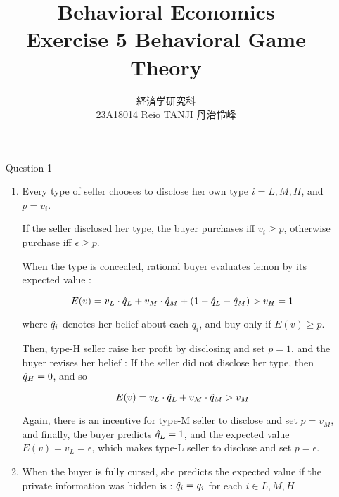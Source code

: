 \documentclass{jsarticle}
\begin{document}
\title{Behavioral Economics \\
Exercise 5 Behavioral Game Theory}
\author{経済学研究科　 \\ 23A18014 Reio TANJI 丹治伶峰}
\date{}
\maketitle

\begin{enumerate}

\item [Question 1]

 \begin{enumerate}
 
 \item
 
 Every type of seller chooses to disclose her own type $i = {L, M, H}$, and $p = v_i$.
 
 If the seller disclosed her type, the buyer purchases iff $v_i \geq p$, otherwise purchase iff $\epsilon \geq p$.
 
 \vspace{0.7zw}
 
 \hspace{2zw}When the type is concealed, rational buyer evaluates lemon by its expected value : 
 
 \[ E(v) = v_L \cdot \Hat{q}_L + v_M \cdot \Hat{q}_M + (1 - \Hat{q}_L - \Hat{q}_M) > v_H = 1 \]
 
 where $\Hat{q}_i$ denotes her belief about each $q_i$, and buy only if $E(v) \geq p$.
 
 Then, type-H seller raise her profit by disclosing and set $p = 1$, and the buyer revises her belief : If the seller did not disclose her type, then $\Hat{q}_H = 0$, and so
 
 \[ E(v) = v_L \cdot \Hat{q}_L + v_M \cdot \Hat{q}_M > v_M \]
 
 Again, there is an incentive for type-M seller to disclose and set $p = v_M$, and finally, the buyer predicts $\Hat{q}_L = 1$, and the expected value $E(v) = v_L = \epsilon$, which makes type-L seller to disclose and set $p = \epsilon$.
 
 \vspace{1zw}
 
  \item \hspace{2zw} When the buyer  is fully cursed, she predicts the expected value if the private information was hidden is : $\Hat{q}_i = q_i$ for each $i \in {L,M,H}$
  

\end{enumerate}
\end{enumerate}
\end{document}
